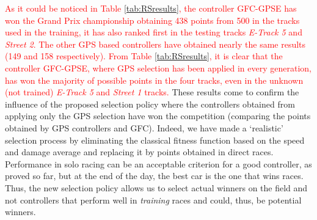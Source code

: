 \documentclass[10pt,journal,compsoc]{IEEEtran}
\begin{document}
%
\textcolor{red}{
As it could be noticed in Table \ref{tab:RSresults}, the controller {\sf GFC-GPSE} has won the Grand Prix championship obtaining 438 points from 500 in the tracks used in the training, it has also ranked first in the testing tracks  \textit{E-Track 5} and \textit{Street 2}. 
The other GPS based controllers have obtained nearly the same results (149 and 158 respectively).
From Table \ref{tab:RSresults}, it is clear that the controller {\sf GFC-GPSE}, where GPS selection has been applied in every generation, has won the majority of possible points in the four tracks, even in the unknown (not trained) \textit{E-Track 5}  and \textit{Street 1} tracks.
}
These results come to confirm the influence of the proposed selection policy where the controllers obtained from applying only the GPS selection have won the competition (comparing the points obtained by GPS controllers and GFC).
Indeed, we have made a `realistic' selection process by eliminating
the classical fitness function based on the speed and damage average
and replacing it by points obtained in direct races. 
Performance in solo racing can be an acceptable criterion for a good
controller, as proved so far, but at the end of the day, the best car
is the one that wins races. Thus, the new selection policy allows us
to select actual winners on the field and not controllers that perform
well in {\em training} races and could, thus, be potential winners.

\end{document}
